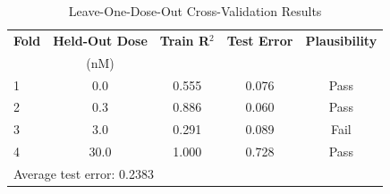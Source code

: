 
\begin{table}[htbp]
\centering
\caption{Leave-One-Dose-Out Cross-Validation Results}
\label{tab:exp2_cross_validation}
\begin{tabular}{lcccc}
\hline
\textbf{Fold} & \textbf{Held-Out Dose} & \textbf{Train R$^2$} & \textbf{Test Error} & \textbf{Plausibility} \\
 & (nM) & & & \\
\hline
1 & 0.0 & 0.555 & 0.076 & Pass \\
2 & 0.3 & 0.886 & 0.060 & Pass \\
3 & 3.0 & 0.291 & 0.089 & Fail \\
4 & 30.0 & 1.000 & 0.728 & Pass \\
\hline
\multicolumn{5}{l}{\small Average test error: 0.2383} \\
\end{tabular}
\end{table}
